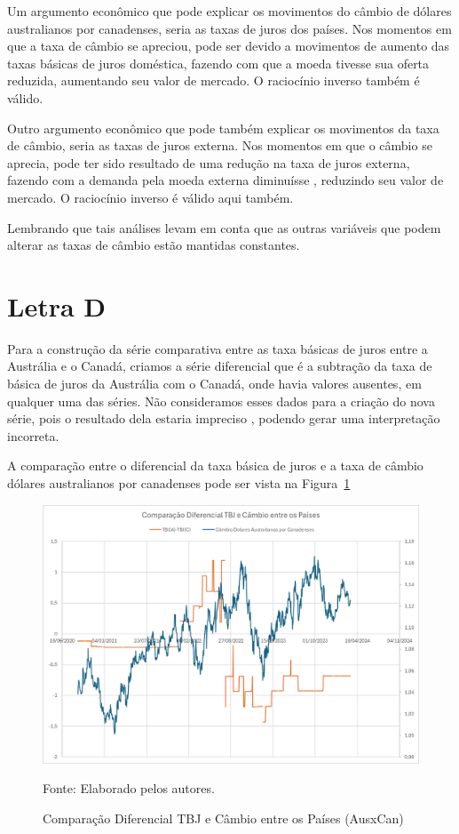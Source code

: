 \documentclass[a4paper,12pt]{article}[abntex2]
\begin{document}
Um argumento econômico que pode explicar os movimentos do câmbio de dólares australianos por canadenses, seria as taxas de juros dos países. Nos momentos em que a taxa de câmbio se apreciou, pode ser devido a movimentos de aumento das taxas básicas de juros doméstica, fazendo com que a moeda tivesse sua oferta reduzida, aumentando seu valor de mercado. O raciocínio inverso também é válido.

Outro argumento econômico que pode também explicar os movimentos da taxa de câmbio, seria as taxas de juros externa. Nos momentos em que o câmbio se aprecia, pode ter sido resultado de uma redução na taxa de juros externa, fazendo com a demanda pela moeda externa diminuísse , reduzindo seu valor de mercado. O raciocínio inverso é válido aqui também.

Lembrando que tais análises levam em conta que as outras variáveis que podem alterar as taxas de câmbio estão mantidas constantes.

\section{\textbf{Letra D}}
Para a construção da série comparativa entre as taxa básicas de juros entre a Austrália e o Canadá, criamos a série diferencial que é a subtração da taxa de básica de juros da Austrália com o Canadá, onde havia valores ausentes, em qualquer uma das séries. Não consideramos esses dados para a criação do nova série, pois o resultado dela estaria impreciso , podendo gerar uma interpretação incorreta. 

A comparação entre o diferencial da taxa básica de juros e a taxa de câmbio dólares australianos por canadenses pode ser vista na Figura~\ref{fig:Comparação Diferencial TBJ e Câmbio entre os Países} 
\begin{figure}[H]
    \centering
    \caption{Comparação Diferencial TBJ e Câmbio entre os Países (AusxCan) } 
    \includegraphics[width=1.0\textwidth]{Comparação Diferencial TBJ e Câmbio entre os Países.png}
    \label{fig:Comparação Diferencial TBJ e Câmbio entre os Países}
    
    \footnotesize{Fonte: Elaborado pelos autores.}
    \end{figure}
\end{document}
